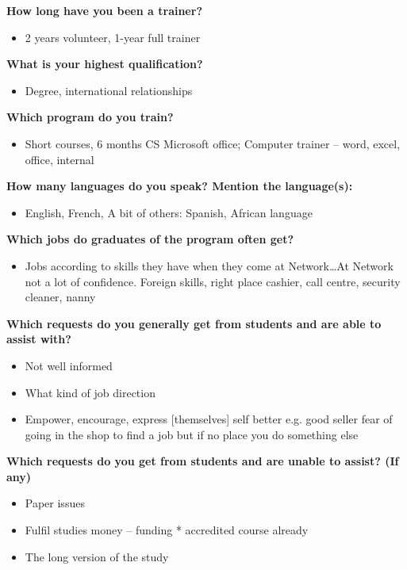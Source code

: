 \noindent\textbf{How long have you been a trainer?}
\begin{itemize}
\item 2 years volunteer, 1-year full trainer
\end{itemize}

\noindent\textbf{What is your highest qualification?}
\begin{itemize}
\item Degree, international relationships
\end{itemize}

\noindent\textbf{Which program do you train?}
\begin{itemize}
\item Short courses, 6 months CS Microsoft office; Computer trainer – word, excel, office, internal
\end{itemize}

\noindent\textbf{How many languages do you speak? Mention the language(s):}
\begin{itemize}
\item English, French, A bit of others: Spanish, African language
\end{itemize}



\noindent\textbf{Which jobs do graduates of the program often get?}
\begin{itemize}
\item Jobs according to skills they have when they come at Network…At Network not a lot of confidence. Foreign skills, right place cashier, call centre, security cleaner, nanny
\end{itemize}

\noindent\textbf{Which requests do you generally get from students and are able to assist with?}
\begin{itemize}
\item Not well informed
\item What kind of job direction
\item Empower, encourage, express [themselves] self better e.g. good seller fear of going in the shop to find a job but if no place you do something else
\end{itemize}

\noindent\textbf{Which requests do you get from students and are unable to assist? (If any)}
\begin{itemize}
\item Paper issues
\item Fulfil studies money – funding * accredited course already
\item The long version of the study
\end{itemize}

